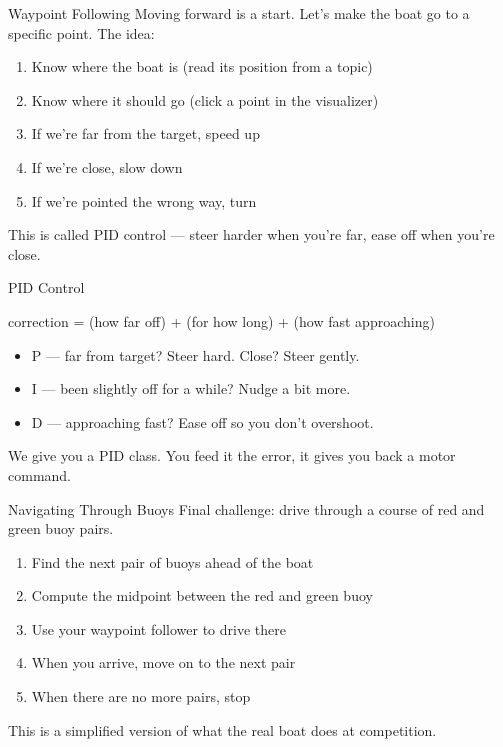 \documentclass[aspectratio=169]{beamer}
\begin{document}
\begin{frame}{Waypoint Following}
    Moving forward is a start. Let's make the boat go to a specific point.
    \vfill
    The idea:
    \begin{enumerate}
        \item Know where the boat is (read its position from a topic)
        \item Know where it should go (click a point in the visualizer)
        \item If we're far from the target, speed up
        \item If we're close, slow down
        \item If we're pointed the wrong way, turn
    \end{enumerate}
    \vfill
    This is called PID control --- steer harder when you're far, ease off when you're close.
\end{frame}

\begin{frame}{PID Control}
    \begin{center}
        \Large
        correction = (how far off) + (for how long) + (how fast approaching)
    \end{center}
    \vfill
    \begin{itemize}
        \item P --- far from target? Steer hard. Close? Steer gently.
        \item I --- been slightly off for a while? Nudge a bit more.
        \item D --- approaching fast? Ease off so you don't overshoot.
    \end{itemize}
    \vfill
    We give you a PID class. You feed it the error, it gives you back a motor command.
\end{frame}

\begin{frame}{Navigating Through Buoys}
    Final challenge: drive through a course of red and green buoy pairs.
    \vfill
    \begin{enumerate}
        \item Find the next pair of buoys ahead of the boat
        \item Compute the midpoint between the red and green buoy
        \item Use your waypoint follower to drive there
        \item When you arrive, move on to the next pair
        \item When there are no more pairs, stop
    \end{enumerate}
    \vfill
    This is a simplified version of what the real boat does at competition.
\end{frame}
\end{document}
